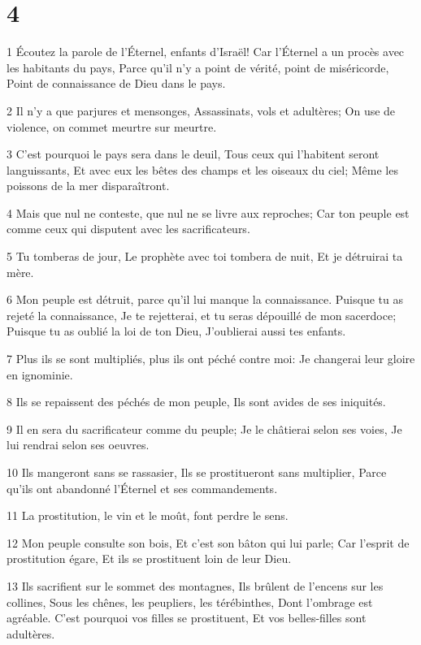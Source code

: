 \chapter{4}

\par 1 Écoutez la parole de l'Éternel, enfants d'Israël! Car l'Éternel a un procès avec les habitants du pays, Parce qu'il n'y a point de vérité, point de miséricorde, Point de connaissance de Dieu dans le pays.
\par 2 Il n'y a que parjures et mensonges, Assassinats, vols et adultères; On use de violence, on commet meurtre sur meurtre.
\par 3 C'est pourquoi le pays sera dans le deuil, Tous ceux qui l'habitent seront languissants, Et avec eux les bêtes des champs et les oiseaux du ciel; Même les poissons de la mer disparaîtront.
\par 4 Mais que nul ne conteste, que nul ne se livre aux reproches; Car ton peuple est comme ceux qui disputent avec les sacrificateurs.
\par 5 Tu tomberas de jour, Le prophète avec toi tombera de nuit, Et je détruirai ta mère.
\par 6 Mon peuple est détruit, parce qu'il lui manque la connaissance. Puisque tu as rejeté la connaissance, Je te rejetterai, et tu seras dépouillé de mon sacerdoce; Puisque tu as oublié la loi de ton Dieu, J'oublierai aussi tes enfants.
\par 7 Plus ils se sont multipliés, plus ils ont péché contre moi: Je changerai leur gloire en ignominie.
\par 8 Ils se repaissent des péchés de mon peuple, Ils sont avides de ses iniquités.
\par 9 Il en sera du sacrificateur comme du peuple; Je le châtierai selon ses voies, Je lui rendrai selon ses oeuvres.
\par 10 Ils mangeront sans se rassasier, Ils se prostitueront sans multiplier, Parce qu'ils ont abandonné l'Éternel et ses commandements.
\par 11 La prostitution, le vin et le moût, font perdre le sens.
\par 12 Mon peuple consulte son bois, Et c'est son bâton qui lui parle; Car l'esprit de prostitution égare, Et ils se prostituent loin de leur Dieu.
\par 13 Ils sacrifient sur le sommet des montagnes, Ils brûlent de l'encens sur les collines, Sous les chênes, les peupliers, les térébinthes, Dont l'ombrage est agréable. C'est pourquoi vos filles se prostituent, Et vos belles-filles sont adultères.
